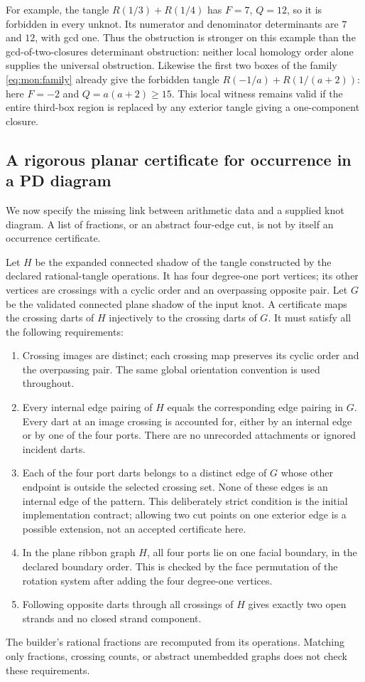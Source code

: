 For example, the tangle $R(1/3)+R(1/4)$ has $F=7$, $Q=12$, so it is
forbidden in every unknot.  Its numerator and denominator determinants are
$7$ and $12$, with gcd one.  Thus the obstruction is stronger on this example
than the gcd-of-two-closures determinant obstruction: neither local homology
order alone supplies the universal obstruction.
Likewise the first two boxes of the family \eqref{eq:mon:family} already give
the forbidden tangle $R(-1/a)+R(1/(a+2))$: here $F=-2$ and
$Q=a(a+2)\ge15$.  This local witness remains valid if the entire third-box
region is replaced by any exterior tangle giving a one-component closure.

\subsection{A rigorous planar certificate for occurrence in a PD diagram}

We now specify the missing link between arithmetic data and a supplied knot
diagram.  A list of fractions, or an abstract four-edge cut, is not by itself
an occurrence certificate.

Let $H$ be the expanded connected shadow of the tangle constructed by the
declared rational-tangle operations.  It has four degree-one port vertices;
its other vertices are crossings with a cyclic order and an overpassing
opposite pair.  Let $G$ be the validated connected plane shadow of the input
knot.  A certificate maps the crossing darts of $H$ injectively to the crossing
darts of $G$.  It must satisfy all the following requirements:
\begin{enumerate}
\item Crossing images are distinct; each crossing map preserves its cyclic
      order and the overpassing pair.  The same global orientation convention
      is used throughout.
\item Every internal edge pairing of $H$ equals the corresponding edge pairing
      in $G$.  Every dart at an image crossing is accounted for, either by an
      internal edge or by one of the four ports.  There are no unrecorded
      attachments or ignored incident darts.
\item Each of the four port darts belongs to a distinct edge of $G$ whose
      other endpoint is outside the selected crossing set. None of these
      edges is an internal edge of the pattern. This deliberately strict
      condition is the initial implementation contract; allowing two cut
      points on one exterior edge is a possible extension, not an accepted
      certificate here.
\item In the plane ribbon graph $H$, all four ports lie on one facial boundary,
      in the declared boundary order.  This is checked by the face permutation
      of the rotation system after adding the four degree-one vertices.
\item Following opposite darts through all crossings of $H$ gives exactly two
      open strands and no closed strand component.
\end{enumerate}
The builder's rational fractions are recomputed from its operations.  Matching
only fractions, crossing counts, or abstract unembedded graphs does not check
these requirements.

